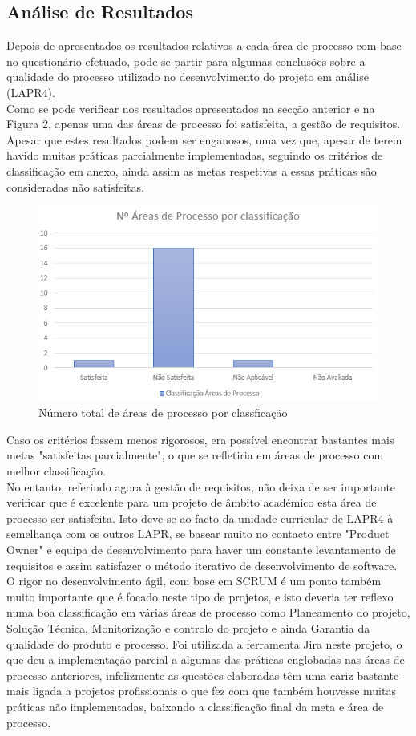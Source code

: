 \documentclass[openany,10pt,a4paper]{article}
\begin{document}
\subsection{Análise de Resultados}
Depois de apresentados os resultados relativos a cada área de processo com base no questionário efetuado, pode-se partir para algumas conclusões sobre a qualidade do processo utilizado no desenvolvimento do projeto em análise (LAPR4). \\
Como se pode verificar nos resultados apresentados na secção anterior e na Figura 2, apenas uma das áreas de processo foi satisfeita, a gestão de requisitos. Apesar que estes resultados podem ser enganosos, uma vez que, apesar de terem havido muitas práticas parcialmente implementadas, seguindo os critérios de classificação em anexo, ainda assim as metas respetivas a essas práticas são consideradas não satisfeitas.\\
\begin{figure}[H]
	\centering
	\includegraphics[width=0.7\linewidth]{graph_results_process.PNG}
	\caption{Número total de áreas de processo por classficação \small}
	\label{fig_quality}
\end{figure}
Caso os critérios fossem menos rigorosos, era possível encontrar bastantes mais metas "satisfeitas parcialmente", o que se refletiria em áreas de processo com melhor classificação.\\
No entanto, referindo agora à gestão de requisitos, não deixa de ser importante verificar que é excelente para um projeto de âmbito académico esta área de processo ser satisfeita. Isto deve-se ao facto da unidade curricular de LAPR4 à semelhança com os outros LAPR, se basear muito no contacto entre "Product Owner" e equipa de desenvolvimento para haver um constante levantamento de requisitos e assim satisfazer o método iterativo de desenvolvimento de software. \\
O rigor no desenvolvimento ágil, com base em SCRUM é um ponto também muito importante que é focado neste tipo de projetos, e isto deveria ter reflexo numa boa classificação em várias áreas de processo como Planeamento do projeto, Solução Técnica, Monitorização e controlo do projeto e ainda Garantia da qualidade do produto e processo. Foi utilizada a ferramenta Jira neste projeto, o que deu a implementação parcial a algumas das práticas englobadas nas áreas de processo anteriores, infelizmente as questões elaboradas têm uma cariz bastante mais ligada a projetos profissionais o que fez com que também houvesse muitas práticas não implementadas, baixando a classificação final da meta e área de processo. \\
\end{document}
